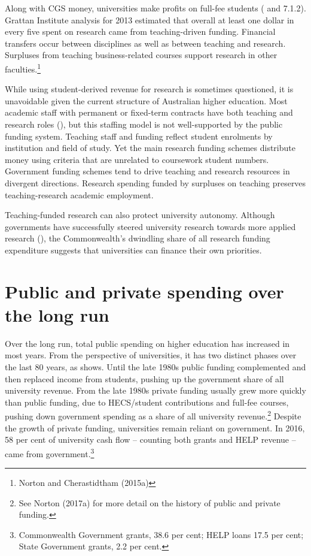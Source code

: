 \documentclass{grattan}
\begin{document}
Along with CGS money, universities make profits on full-fee students ( and 7.1.2). Grattan Institute analysis for 2013 estimated that overall at least one dollar in every five spent on research came from teaching-driven funding. Financial transfers occur between disciplines as well as between teaching and research. Surpluses from teaching business-related courses support research in other faculties.\footnote{Norton and Cherastidtham (2015a)}

While using student-derived revenue for research is sometimes questioned, it is unavoidable given the current structure of Australian higher education. Most academic staff with permanent or fixed-term contracts have both teaching and research roles (), but this staffing model is not well-supported by the public funding system. Teaching staff and funding reflect student enrolments by institution and field of study. Yet the main research funding schemes distribute money using criteria that are unrelated to coursework student numbers. Government funding schemes tend to drive teaching and research resources in divergent directions. Research spending funded by surpluses on teaching preserves teaching-research academic employment.

Teaching-funded research can also protect university autonomy. Although governments have successfully steered university research towards more applied research (), the Commonwealth's dwindling share of all research funding expenditure suggests that universities can finance their own priorities.

%
\section{Public and private spending over the long run}\label{sec:public-and-private-spending-over-the-long-run}

Over the long run, total public spending on higher education has increased in most years. From the perspective of universities, it has two distinct phases over the last 80 years, as  shows. Until the late 1980s public funding complemented and then replaced income from students, pushing up the government share of all university revenue. From the late 1980s private funding usually grew more quickly than public funding, due to HECS/student contributions and full-fee courses, pushing down government spending as a share of all university revenue.\footnote{See Norton (2017a) for more detail on the history of public and private funding.} Despite the growth of private funding, universities remain reliant on government. In 2016, 58 per cent of university cash flow -- counting both grants and HELP revenue -- came from government.\footnote{Commonwealth Government grants, 38.6 per cent; HELP loans 17.5 per cent; State Government grants, 2.2 per cent.}
\end{document}
